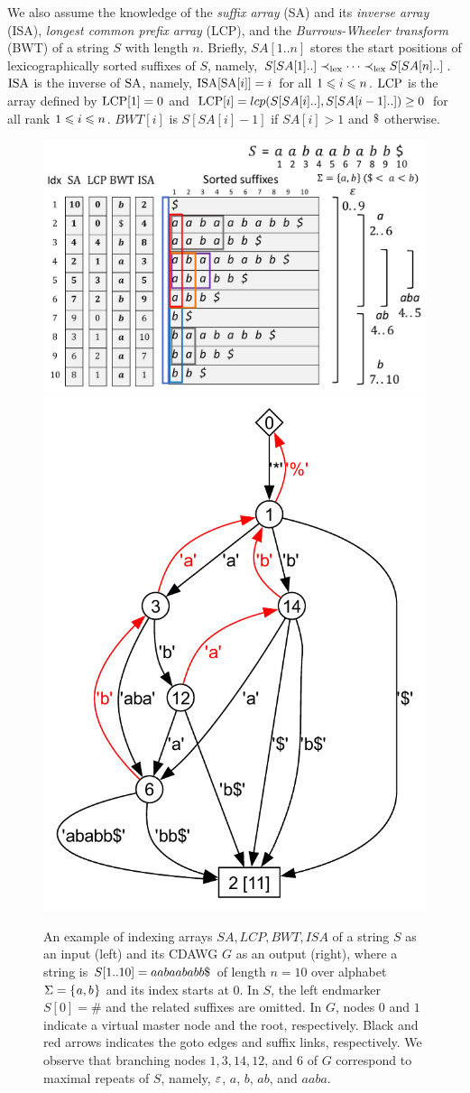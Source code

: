 \documentclass{article}
\begin{document}
We also assume the knowledge of the \textit{suffix array} (SA) and its \textit{inverse array} (ISA), \textit{longest common prefix array} (LCP), and the \textit{Burrows-Wheeler transform} (BWT) of a string $S$ with length $n$. 
Briefly, $SA[1..n]$ stores the start positions of lexicographically sorted suffixes of $S$, namely, 
$S[SA[1]..] \prec_\lex \dots \prec_\lex S[SA[n]..]$. 
$\ISA$ is the inverse of $\SA$, namely, $\ISA[\SA[i]] = i$ for all $\btw i1n$.
$\LCP$ is the array defined by $\LCP[1] = 0$ and $\LCP[i] = lcp(S[SA[i]..], S[SA[i-1]..]) \ge 0$ for all rank $\btw i1n$. 
$BWT[i]$ is $S[SA[i]-1]$ if $SA[i]>1$ and $\daller$ otherwise. 

\begin{figure}[t]
\centering  
\includegraphics[height=0.39\textwidth]{fig1.pdf}
\includegraphics[height=0.39\textwidth]{fig7.pdf}
\vspace{.5\baselineskip}
\caption{An example of indexing arrays $SA, LCP, BWT, ISA$ of a string $S$ as an input (left) and its CDAWG $G$ as an output (right),
where a string is $S[1..10] = aabaababb\daller$ of length $n = 10$ over alphabet $\Sigma = \set{a, b}$ and its index starts at $0$. 
  In $S$, the left endmarker $S[0]=\#$ and the related suffixes are omitted. In $G$, nodes $0$ and $1$ indicate a virtual master node and the root, respectively. Black and red arrows indicates the goto edges and suffix links, respectively. 
  We observe that branching nodes $1, 3,14,12$, and $6$ of $G$ correspond to maximal repeats of $S$, namely, $\eps$, $a$, $b$, $ab$, and $aaba$. 
}\label{fig:example:arrays}
\end{figure}
\end{document}
